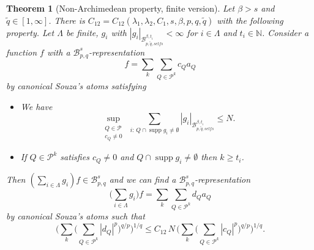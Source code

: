 \documentclass[11pt]{amsart}
\newtheorem{theorem}{Theorem}[section]
\theoremstyle{definition}
\begin{document}
\begin{theorem}[Non-Archimedean property, finite version]\label{sepa}
Let $\beta > s$ and $\tilde q \in [1,\infty]$. There is
$C_{12}=C_{12}(\lambda_1,\lambda_2,C_1,s,\beta,p,q,\tilde q)$ with the
following property. Let $\Lambda$ be finite, $g_i$ with
$|g_i|_{\mathcal{B}^{\beta,t_i}_{p,\tilde{q},selfs}} < \infty$ for $i\in
\Lambda$ and $t_i \in \mathbb{N}$. Consider a function $f$ with a
$\mathcal{B}^s_{p,q}$-representation
$$ f=\sum_k \sum_{Q\in \mathcal{P}^k} c_Q a_Q$$
by canonical Souza's atoms satisfying
\begin{itemize}
\item[A.] We have
$$\sup_{\substack{ Q\in \mathcal{P} \\ c_Q\neq 0}} \
\sum_{i\colon\, Q\cap \operatorname{supp} g_i \neq \emptyset} |g_i|_{ \mathcal{B}^{\beta,t_i}_{p,\tilde{q},selfs}} \leq N.$$
\item[B.] If $Q\in \mathcal{P}^k$ satisfies $c_Q\neq 0$ and
$Q\cap \operatorname{supp} g_i \neq \emptyset$ then $k\geq t_i$.
\end{itemize}
Then $(\sum_{i\in\Lambda} g_i)f \in \mathcal{B}^s_{p,q}$ and we can find a
$\mathcal{B}^s_{p,q}$-representation
\begin{equation} \label{rre} \big(\sum_{i\in\Lambda} g_i\big)f= \sum_k \sum_{Q\in \mathcal{P}^k} d_Q a_Q\end{equation}
by canonical Souza's atoms such that
\begin{equation}\label{reep33} \Big(\sum_k \big( \sum_{Q\in \mathcal{P}^k} |d_Q|^p \big)^{q/p} \Big)^{1/q}
\leq C_{12}\, N\, \Big(\sum_k \big( \sum_{Q\in \mathcal{P}^k} |c_Q|^p \big)^{q/p} \Big)^{1/q}.
\end{equation}
\end{theorem}
\end{document}
